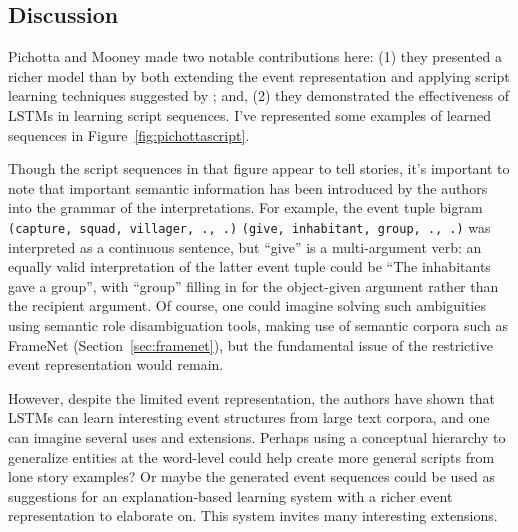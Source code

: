 \subsection{Discussion}
Pichotta and Mooney made two notable contributions here: (1) they presented a richer model than \citep{chambers2008unsupervised} by both extending the event representation and applying script learning techniques suggested by \citep{jans2012skip}; and, (2) they demonstrated the effectiveness of LSTMs in learning script sequences. I've represented some examples of learned sequences in Figure~\ref{fig:pichottascript}.

Though the script sequences in that figure appear to tell stories, it's important to note that important semantic information has been introduced by the authors into the grammar of the interpretations. For example, the event tuple bigram \texttt{(capture, squad, villager, ., .)} \texttt{(give, inhabitant, group, ., .)} was interpreted as a continuous sentence, but ``give'' is a multi-argument verb: an equally valid interpretation of the latter event tuple could be ``The inhabitants gave a group'', with ``group'' filling in for the object-given argument rather than the recipient argument. Of course, one could imagine solving such ambiguities using semantic role disambiguation tools, making use of semantic corpora such as FrameNet (Section~\ref{sec:framenet}), but the fundamental issue of the restrictive event representation would remain.

However, despite the limited event representation, the authors have shown that LSTMs can learn interesting event structures from large text corpora, and one can imagine several uses and extensions. Perhaps using a conceptual hierarchy to generalize entities at the word-level could help create more general scripts from lone story examples? Or maybe the generated event sequences could be used as suggestions for an explanation-based learning system with a richer event representation to elaborate on. This system invites many interesting extensions.

